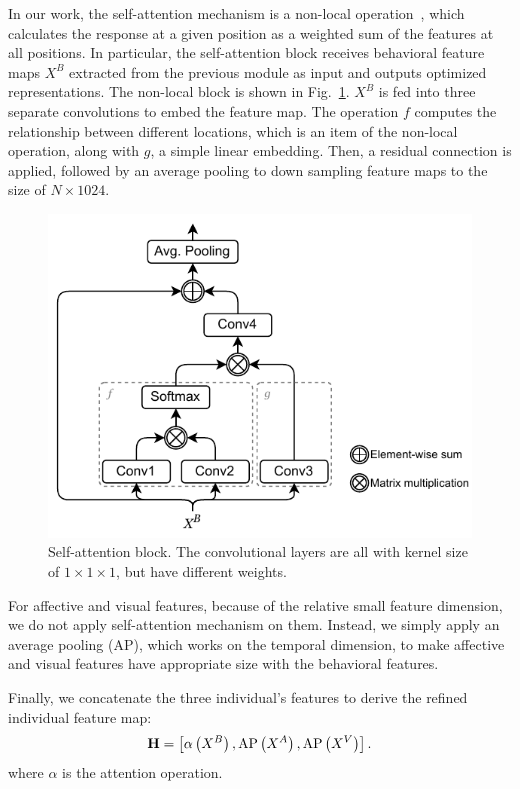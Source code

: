 \documentclass[twocolumn]{svjour3}
\begin{document}
In our work, the self-attention mechanism is a non-local operation~\cite{Wang2018NonLocal}, which calculates the response at a given position as a weighted sum of the features at all positions. In particular, the self-attention block receives behavioral feature maps $X^B$ extracted from the previous module as input and outputs optimized representations. The non-local block is shown in Fig.~\ref{f:self-attention}. $X^B$ is fed into three separate convolutions to embed the feature map. The operation $f$ computes the relationship between different locations, which is an item of the non-local operation, along with $g$, a simple linear embedding. Then, a residual connection is applied, followed by an average pooling to down sampling feature maps to the size of $N\times1024$.

\begin{figure}[t]
  \centering
  \includegraphics[width=0.9\linewidth]{assets/self-attention.drawio}
  \caption{Self-attention block. The convolutional layers are all with kernel size of $1\times1\times1$, but have different weights.}
  \label{f:self-attention}
\end{figure}

For affective and visual features, because of the relative small feature dimension, we do not apply self-attention mechanism on them. Instead, we simply apply an average pooling (AP), which works on the temporal dimension, to make affective and visual features have appropriate size with the behavioral features.

Finally, we concatenate the three individual's features to derive the refined individual feature map:
\begin{equation}
\label{eq:h}
  \mathbf{H} = \left[\alpha\left(X^B\right), {\rm AP}\left(X^A\right), {\rm AP}\left(X^V\right)\right].
\end{equation}
where $\alpha$ is the attention operation.
\end{document}
